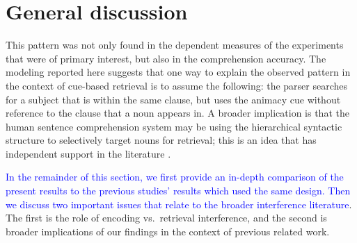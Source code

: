 \documentclass[a4paper, man, floatsintext]{apa7}
\begin{document}
{{}%

\section{General discussion}

\label{only_this_design} This pattern was not only found in the dependent measures of the experiments that were of primary interest, but also in the comprehension accuracy. 
The modeling reported here suggests that one way to explain the observed pattern in the context of cue-based retrieval is to assume the following: the parser searches for a subject that is within the same clause, but uses the animacy cue without reference to the clause that a noun appears in. A broader implication is that the human sentence comprehension system may be using the hierarchical syntactic structure to selectively target nouns for retrieval; this is an idea that has independent support in the literature \citep[e.g.,][]{Sturt2003,dillon2013,yadav2021individual}.

\textcolor{blue}{In the remainder of this section, we first provide an in-depth comparison of the present results to the previous studies' results which used the same design. Then we discuss two important issues that relate to the broader interference literature}. The first is the role of encoding vs.\ retrieval interference, and the second is broader implications of our findings in the context of previous related work.

}
\end{document}
